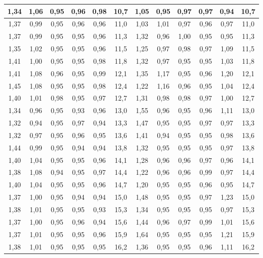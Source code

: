 \begin{table}[H]
\begin{center}
{\begin{tabular}{| c | c | c | c | c | c | c | c | c | c | c | c |}
\hline
1,34 &	1,06 &	0,95 &	0,96 &	0,98 &	10,7 & 1,05 & 0,95 & 0,97 & 0,97 & 0,94 & 10,7\\
\hline
1,37 &	0,99 &	0,95 &	0,96 &	0,96 &	11,0 & 1,03 & 1,01 & 0,97 & 0,96 & 0,97 & 11,0\\
\hline
1,37 &	0,99 &	0,95 &	0,95 &	0,96 &	11,3 & 1,32 & 0,96 & 1,00 & 0,95 & 0,95 & 11,3\\
\hline
1,35 &	1,02 &	0,95 &	0,95 &	0,96 &	11,5 & 1,25 & 0,97 & 0,98 & 0,97 & 1,09 & 11,5\\
\hline
1,41 &	1,00 &	0,95 &	0,95 &	0,98 &	11,8 & 1,32 & 0,97 & 0,95 & 0,95 & 1,03 & 11,8\\
\hline
1,41 &	1,08 &	0,96 &	0,95 &	0,99 &	12,1 & 1,35 & 1,17 & 0,95 & 0,96 & 1,20 & 12,1\\
\hline
1,45 &	1,08 &	0,95 &	0,95 &	0,98 &	12,4 & 1,22 & 1,16 & 0,96 & 0,95 & 1,04 & 12,4\\
\hline
1,40 &	1,01 &	0,98 &	0,95 &	0,97 &	12,7 & 1,31 & 0,98 & 0,98 & 0,97 & 1,00 & 12,7\\
\hline
1,34 &	0,96 &	0,95 &	0,93 &	0,96 &	13,0 & 1,55 & 0,96 & 0,95 & 0,96 & 1,11 & 13,0\\
\hline
1,32 &	0,94 &	0,95 &	0,97 &	0,94 &	13,3 & 1,47 & 0,95 & 0,95 & 0,97 & 0,97 & 13,3\\
\hline
1,32 &	0,97 &	0,95 &	0,96 &	0,95 &	13,6 & 1,41 & 0,94 & 0,95 & 0,95 & 0,98 & 13,6\\
\hline
1,44 &	0,99 &	0,95 &	0,94 &	0,94 &	13,8 & 1,32 & 0,95 & 0,95 & 0,95 & 0,97 & 13,8\\
\hline
1,40 &	1,04 &	0,95 &	0,95 &	0,96 &	14,1 & 1,28 & 0,96 & 0,96 & 0,97 & 0,96 & 14,1\\
\hline
1,38 &	1,08 &	0,94 &	0,95 &	0,97 &	14,4 & 1,22 & 0,96 & 0,96 & 0,99 & 0,97 & 14,4\\
\hline
1,40 &	1,04 &	0,95 &	0,95 &	0,96 &	14,7 & 1,20 & 0,95 & 0,95 & 0,96 & 0,95 & 14,7\\
\hline
1,37 &	1,00 &	0,95 &	0,94 &	0,94 &	15,0 & 1,48 & 0,95 & 0,95 & 0,97 & 1,23 & 15,0\\
\hline
1,38 &	1,01 &	0,95 &	0,95 &	0,93 &	15,3 & 1,34 & 0,95 & 0,95 & 0,95 & 0,97 & 15,3\\
\hline
1,37 &	1,00 &	0,95 &	0,96 &	0,94 &	15,6 & 1,44 & 0,96 & 0,97 & 0,99 & 1,01 & 15,6\\
\hline
1,37 &	1,01 &	0,95 &	0,95 &	0,96 &	15,9 & 1,64 & 0,95 & 0,95 & 0,95 & 1,21 & 15,9\\
\hline
1,38 &	1,01 &	0,95 &	0,95 &	0,95 &	16,2 & 1,36 & 0,95 & 0,95 & 0,96 & 1,11 & 16,2\\

\end{tabular}}
\end{center}
\end{table}

